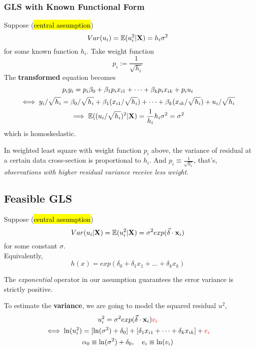 \documentclass[]{article}
\begin{document}
			\subsubsection{GLS with Known Functional Form}
				Suppose (\hl{central assumption})
				\[
					Var(u_i) = \mathbb{E}({u_i^2|\textbf{X}}) = h_i \sigma^2
				\]
				for some known function $h_i$. Take weight function
				\[
					p_i := \frac{1}{\sqrt{h_i}}
				\]
				The \textbf{transformed} equation becomes
				\begin{gather*}
					p_i y_i = p_i \beta_0 + \beta_1 p_i x_{i1} + \dots + \beta_k p_i x _{ik} + p_i u_i \\
					\iff y_i / \sqrt{h_i} = \beta_0 / \sqrt{h_i} + \beta_1 (x_{i1}/\sqrt{h_i}) + \dots + \beta_k (x_{ik}/\sqrt{h_i}) + u_i / \sqrt{h_i} \\
					\implies \mathbb{E}({(u_i / \sqrt{h_i})^2 | \textbf{X}}) = \frac{1}{h_i} h_i \sigma^2 = \sigma^2
				\end{gather*}
				which is homoskedastic.
				\begin{remark}
					In weighted least square with weight function $p_i$ above, the variance of residual at a certain data cross-section is proportional to $h_i$. And $p_i \equiv \frac{1}{\sqrt{h_i}}$, that's, \emph{observations with higher residual variance receive less weight}.
				\end{remark}
			\subsection{Feasible GLS}
				Suppose (\hl{central assumption})
				\[
					Var(u_i|\textbf{X}) = \mathbb{E}({u_i^2|\textbf{X}}) = \sigma^2 exp(\vec{\delta} \cdot \textbf{x}_i)
				\]
				for some constant $\sigma$. \\
				Equivalently,
				\[
					h(x) = exp(\delta_0 + \delta_1 x_1 + \dots + \delta_k x_k)
				\]
				\begin{remark}
					The \emph{exponential} operator in our assumption guarantees the error variance is strictly positive.
				\end{remark}
				To estimate the \textbf{variance}, we are going to model the squared residual $u^2$,
				\begin{gather*}
					u_i^2 = \sigma^2 exp(\vec{\delta} \cdot \textbf{x}_i)\textcolor{red}{v_i} \\
					\iff \ln(u_i^2) = [\ln(\sigma^2) + \delta_0] + [\delta_1 x_{i1} + \dots + \delta_k x_{ik}] + \textcolor{red}{e_i} \\
					\alpha_0 \equiv \ln(\sigma^2) + \delta_0,\quad e_i \equiv \ln(v_i)
				\end{gather*}
\end{document}
